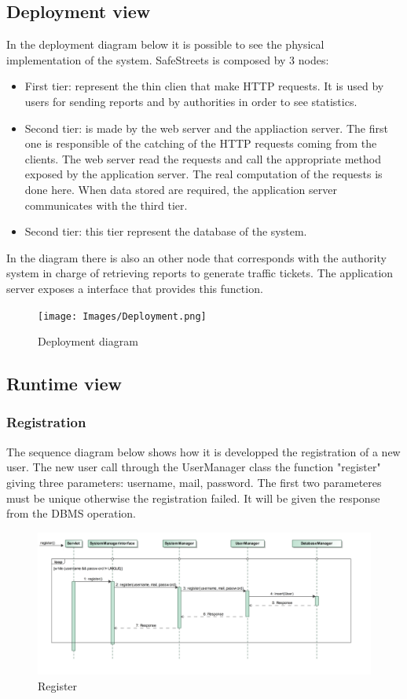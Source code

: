 \subsection{Deployment view}
In the deployment diagram below it is possible to see the physical implementation of the system.
SafeStreets is composed by 3 nodes:
\begin{itemize}
	\item 
	First tier: represent the thin clien that make HTTP requests. It is used by users for sending reports and by authorities in order to see statistics.
	\item 
	Second tier: is made by the web server and the appliaction server. The first one is responsible of the catching of the HTTP requests coming from the clients. The web server read the requests and call the appropriate method exposed by the application server. The real computation of the requests is done here.
	When data stored are required, the application server communicates with the third tier.
	\item 
	Second tier: this tier represent the database of the system. 
\end{itemize} 

In the diagram there is also an other node that corresponds with the authority system in charge of retrieving reports to generate traffic tickets. The application server exposes a interface that provides this function. 

\begin{figure}[H]
	\centering
	\texttt{[image: Images/Deployment.png]}
	\caption{Deployment diagram}
\end{figure}

\subsection{Runtime view}
\newpage

\subsubsection{Registration}
The sequence diagram below shows how it is developped the registration of a new user. The new user call through the UserManager class the function "register" giving three parameters: username, mail, password. The first two parameteres must be unique otherwise the registration failed.
It will be given the response from the DBMS operation.
\newpage
\begin{figure}
	\centering
	\includegraphics[width=0.95\linewidth, height=0.37\textheight]{Images/RunTimeDiagram/Sequence1}
	\caption{Register}
	\label{fig:Register}
\end{figure}
